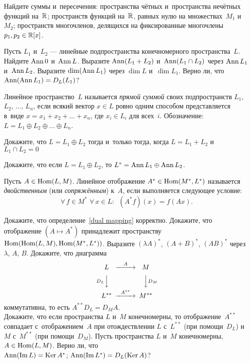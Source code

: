 \documentclass[a4paper,12pt,fleqn]{article}
\renewcommand{\ker}{\mathrm{Ker\,}}
\newcommand{\im}{\mathrm{Im\,}}
\begin{document}
Найдите суммы и~пересечения:
пространства чётных и~пространства нечётных функций на~$\mathbb{R}$;
пространств функций на~$\mathbb{R}$, равных нулю на множествах~$M_1$ и~$M_2$;
пространств многочленов, делящихся на фиксированные многочлены $p_1,p_2\in\mathbb{R}[x]$.

Пусть $L_1$ и~$L_2$ --- линейные подпространства конечномерного пространства~$L$.
 Найдите $\operatorname{Ann}0$ и~$\operatorname{Ann} L$.
 Выразите $\operatorname{Ann}(L_1+L_2)$ и~$\operatorname{Ann}(L_1\cap L_2)$ через $\operatorname{Ann} L_1$ и~$\operatorname{Ann} L_2$.
 Выразите $\dim(\operatorname{Ann} L_1)$ через $\dim L$ и~$\dim L_1$.
 Верно ли, что $\operatorname{Ann}(\operatorname{Ann} L_1)=D_L(L_1)$?

Линейное пространство~$L$ называется \emph{прямой суммой} своих подпространств $L_1,$ $L_2,\,\ldots,\,L_n$, если всякий вектор $x\in L$ ровно одним способом представляется в~виде $x=x_1+x_2+\ldots+x_n$, где $x_i\in L_i$ для всех~$i$. Обозначение: $L=L_1\oplus L_2\oplus\ldots\oplus L_n$.

Докажите, что $L=L_1\oplus L_2$ тогда и~только тогда, когда $L=L_1+L_2$ и~$L_1\cap L_2=0$

Докажите, что если $L=L_1\oplus L_2$, то $L^*=\operatorname{Ann} L_1\oplus\operatorname{Ann} L_2$.

  \label{dual mapping}
Пусть $A\in\operatorname{Hom}(L,M)$. Линейное отображение $A^*\in\operatorname{Hom}(M^*,L^*)$ называется \emph{двойственным} (или \emph{сопряжённым}) к~$A$, если выполняется следующее условие: \vskip -2mm
$$
\forall\,f\in M^*\,\,\forall\,x\in L:\,\,\,(A^*f)(x)=f(Ax).
$$
\vskip -3mm

Докажите, что определение~\ref{dual mapping} корректно.
Докажите, что отображение $(A\mapsto A^*)$ принадлежит пространству $\operatorname{Hom}(\operatorname{Hom}(L,M),\operatorname{Hom}(M^*,L^*))$.
Выразите $(\lambda A)^*$, $(A+B)^*$, $(AB)^*$ через $\lambda$, $A$, $B$.
% 
Докажите, что диаграмма
$$
\begin{CD}
 L @>{A}>> M\\
 @VD_LVV @VVD_MV\\
 L^{**} @>{A}^{**}>> M^{**}
\end{CD}
$$
коммутативна, то есть $A^{**}D_L=D_MA$.\\
Докажите, что если пространства $L$ и~$M$ конечномерны, то отображение~$A^{**}$ совпадает с~отображением~$A$ при отождествлении $L$ с~$L^{**}$ (при помощи~$D_L$) и~$M$ с~$M^{**}$ (при помощи~$D_M$).
% 
Пусть пространства $L$ и~$M$ конечномерны, $A\in\operatorname{Hom}(L,M)$. Верно ли, что\\
 $\Ann(\im L)=\ker A^*$;
 $\Ann(\im L^*)=D_L(\ker A)$?

{}
\end{document}
